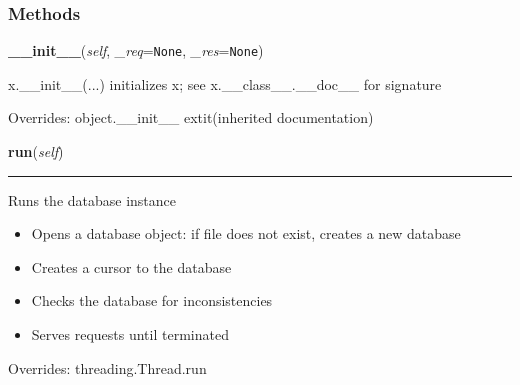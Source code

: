 
  \subsubsection{Methods}

    \vspace{0.5ex}

\hspace{.8\funcindent}\begin{boxedminipage}{\funcwidth}

    \raggedright \textbf{\_\_init\_\_}(\textit{self}, \textit{\_req}={\tt None}, \textit{\_res}={\tt None})

\setlength{\parskip}{2ex}
    x.\_\_init\_\_(...) initializes x; see x.\_\_class\_\_.\_\_doc\_\_ for 
    signature

\setlength{\parskip}{1ex}
      Overrides: object.\_\_init\_\_ 	extit{(inherited documentation)}

    \end{boxedminipage}

    \vspace{0.5ex}

\hspace{.8\funcindent}\begin{boxedminipage}{\funcwidth}

    \raggedright \textbf{run}(\textit{self})

    \vspace{-1.5ex}

    \rule{\textwidth}{0.5\fboxrule}
\setlength{\parskip}{2ex}
    Runs the database instance

    \begin{itemize}
    \setlength{\parskip}{0.6ex}
      \item Opens a database object: if file does not exist, creates a new 
        database

      \item Creates a cursor to the database

      \item Checks the database for inconsistencies

      \item Serves requests until terminated

    \end{itemize}

\setlength{\parskip}{1ex}
      Overrides: threading.Thread.run

    \end{boxedminipage}

